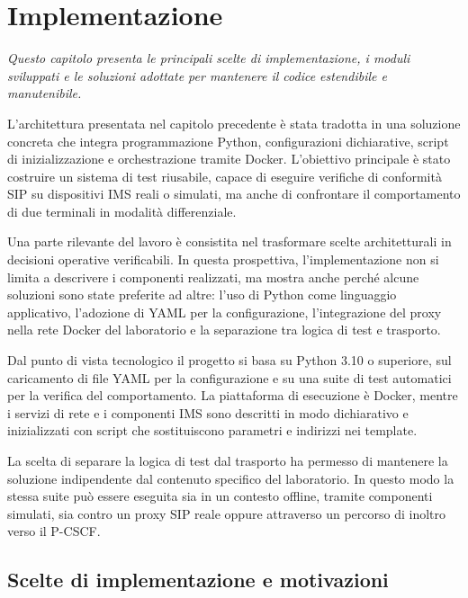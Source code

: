 \chapter{Implementazione}
\begin{minipage}{12cm}\textit{Questo capitolo presenta le principali scelte di implementazione, i moduli sviluppati e le soluzioni adottate per mantenere il codice estendibile e manutenibile.}
\end{minipage}
\vspace*{1cm}

L'architettura presentata nel capitolo precedente \`e stata tradotta in una soluzione concreta che integra programmazione Python, configurazioni dichiarative, script di inizializzazione e orchestrazione tramite Docker. L'obiettivo principale \`e stato costruire un sistema di test riusabile, capace di eseguire verifiche di conformit\`a SIP su dispositivi IMS reali o simulati, ma anche di confrontare il comportamento di due terminali in modalit\`a differenziale.

Una parte rilevante del lavoro \`e consistita nel trasformare scelte architetturali in decisioni operative verificabili. In questa prospettiva, l'implementazione non si limita a descrivere i componenti realizzati, ma mostra anche perch\'e alcune soluzioni sono state preferite ad altre: l'uso di Python come linguaggio applicativo, l'adozione di YAML per la configurazione, l'integrazione del proxy nella rete Docker del laboratorio e la separazione tra logica di test e trasporto.

Dal punto di vista tecnologico il progetto si basa su Python 3.10 o superiore, sul caricamento di file YAML per la configurazione e su una suite di test automatici per la verifica del comportamento. La piattaforma di esecuzione \`e Docker, mentre i servizi di rete e i componenti IMS sono descritti in modo dichiarativo e inizializzati con script che sostituiscono parametri e indirizzi nei template.

La scelta di separare la logica di test dal trasporto ha permesso di mantenere la soluzione indipendente dal contenuto specifico del laboratorio. In questo modo la stessa suite pu\`o essere eseguita sia in un contesto offline, tramite componenti simulati, sia contro un proxy SIP reale oppure attraverso un percorso di inoltro verso il P-CSCF.

\section{Scelte di implementazione e motivazioni}


